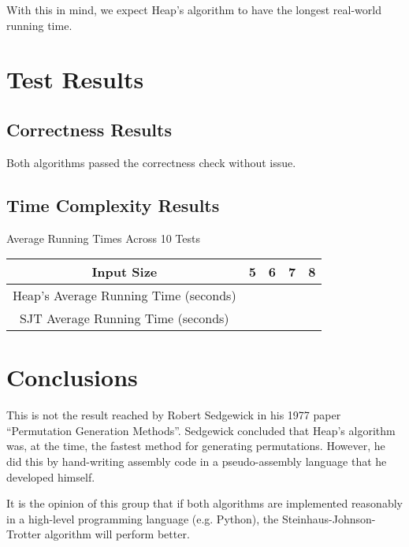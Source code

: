 \documentclass[10pt, oneside]{article}   	%
\begin{document}
With this in mind, we expect Heap's algorithm to have the longest real-world running time.

\section{Test Results}

\subsection{Correctness Results}

Both algorithms passed the correctness check without issue.

\subsection{Time Complexity Results}

\begin{center}
Average Running Times Across 10 Tests \\
\begin{tabular}{|c|c|c|c|c|}
	\hline
	Input Size & 5 & 6 & 7 & 8 \\
	\hline
	Heap's Average Running Time (seconds) & & & & \\
	\hline
	SJT Average Running Time (seconds) & & & & \\
	\hline
\end{tabular}
\end{center}

\section{Conclusions}

This is not the result reached by Robert Sedgewick in his 1977 paper ``Permutation Generation Methods''. Sedgewick concluded that Heap's algorithm was, at the time, the fastest method for generating permutations. However, he did this by hand-writing assembly code in a pseudo-assembly language that he developed himself.

It is the opinion of this group that if both algorithms are implemented reasonably in a high-level programming language (e.g. Python), the Steinhaus-Johnson-Trotter algorithm will perform better.
\end{document}
